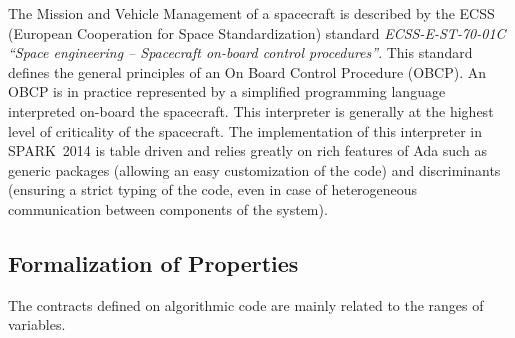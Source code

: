 \documentclass[10pt,a4paper,twocolumn]{article}
\newcommand{\newspark}{SPARK~2014\xspace}
\begin{document}
The Mission and Vehicle Management of a spacecraft is described by the
ECSS (European Cooperation for Space Standardization) standard {\it
  ECSS-E-ST-70-01C ``Space engineering -- Spacecraft on-board control
  procedures''}. This standard defines the general principles of an On
Board Control Procedure (OBCP). An OBCP is in practice represented by
a simplified programming language interpreted on-board the
spacecraft. This interpreter is generally at the highest level of
criticality of the spacecraft. The implementation of this interpreter
in \newspark is table driven and relies greatly on rich features of
Ada such as generic packages (allowing an easy customization of the
code) and discriminants (ensuring a strict typing of the code, even in
case of heterogeneous communication between components of the system).


\subsection{Formalization of Properties}

The contracts defined on algorithmic code are mainly related to the
ranges of variables.

\end{document}
